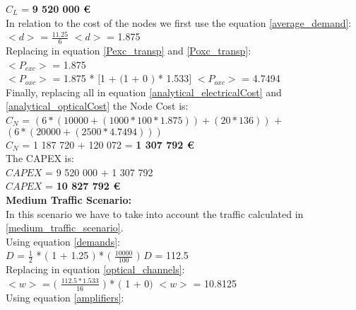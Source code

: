 $C_L$ = \textbf{9 520 000 \euro}\\

In relation to the cost of the nodes we first use the equation \ref{average_demand}:\\

$<d>$ = $\frac{11.25}{6}$ \qquad \qquad $<d>$ = 1.875\\

Replacing in equation \ref{Pexc_transp} and \ref{Poxc_transp}:\\

$<P_{exc}>$ = 1.875\\

$<P_{oxc}>$ = 1.875 * $[$1 + $($1 + $0$ $)$ * 1.533$]$ \qquad \quad $<P_{oxc}>$ = 4.7494 \\

Finally, replacing all in equation \ref{analytical_electricalCost} and \ref{analytical_opticalCost} the Node Cost is:\\

$C_N$ = $\left(6 * (10 000 + (1 000 * 100 * 1.875)) + (20 * 136)\right)$ + $\left(6 * (20 000 + (2 500 * 4.7494 )) \right)$\\

$C_N$ = 1 187 720 + 120 072 = \textbf{1 307 792 \euro}\\

The CAPEX is:\\
$CAPEX$ = 9 520 000 + 1 307 792\\

$CAPEX$ = \textbf{10 827 792 \euro}\\


\textbf{Medium Traffic Scenario:}\\
In this scenario we have to take into account the traffic calculated in \ref{medium_traffic_scenario}.\\

Using equation \ref{demands}:\\

$D$ = $\frac{1}{2}$ * $($ 1 + 1.25 $)$ * $($ $\frac{10000}{100}$ $)$ \qquad \qquad $D$ = 112.5\\

Replacing in equation \ref{optical_channels}:\\

$<w>$ = $($ $\frac{112.5 * 1.533}{16}$ $)$ * $($ 1 + 0$)$ \qquad \qquad $<w>$ = 10.8125\\

Using equation \ref{amplifiers}:\\

